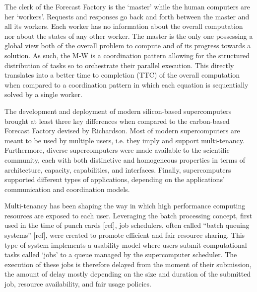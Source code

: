 \documentclass{sig-alternate}
\begin{document}
The clerk of the Forecast Factory is the `master' while the human computers are
her `workers'. Requests and responses go back and forth between the master and
all its workers. Each worker has no information about the overall computation
nor about the states of any other worker. The master is the only one possessing
a global view both of the overall problem to compute and of its progress
towards a solution. As such, the M-W is a coordination pattern allowing for the
structured distribution of tasks so to orchestrate their parallel execution.
This directly translates into a better time to completion (TTC) of the overall
computation when compared to a coordination pattern in which each equation is
sequentially solved by a single worker.


The development and deployment of modern silicon-based supercomputers brought
at least three key differences when compared to the carbon-based Forecast
Factory devised by Richardson. Most of modern supercomputers are meant to be
used by multiple users, i.e. they imply and support multi-tenancy. Furthermore,
diverse supercomputers were made available to the scientific community, each
with both distinctive and homogeneous properties in terms of architecture,
capacity, capabilities, and interfaces. Finally, supercomputers supported
different types of applications, depending on the applications' communication
and coordination models.

Multi-tenancy has been shaping the way in which high performance computing
resources are exposed to each user. Leveraging the batch processing concept,
first used in the time of punch cards [ref], job schedulers, often called
``batch queuing systems'' [ref], were created to promote efficient and fair
resource sharing. This type of system implements a usability model where users
submit computational tasks called `jobs' to a queue managed by the
supercomputer scheduler. The execution of these jobs is therefore delayed from
the moment of their submission, the amount of delay mostly depending on the
size and duration of the submitted job, resource availability, and fair usage
policies.
\end{document}
